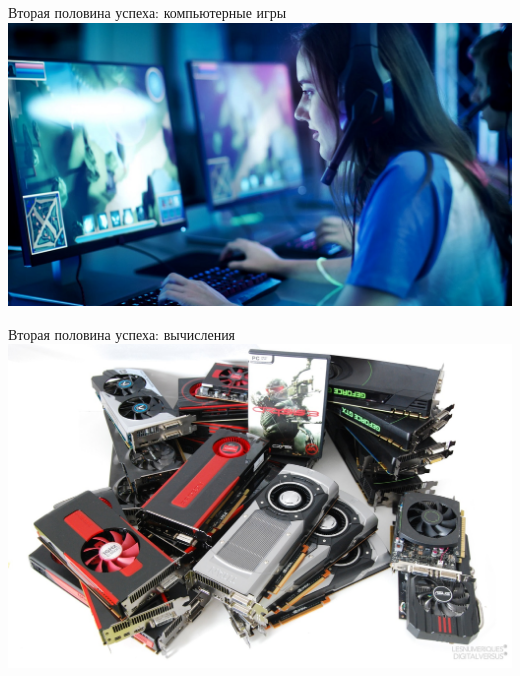 \documentclass[aspectratio=169]{beamer}
\begin{document}
\begin{frame}{Вторая половина успеха: компьютерные игры}
    \centering
    \includegraphics[width=.83\linewidth]{graphs/fig23.jpg}
\end{frame}

\begin{frame}{Вторая половина успеха: вычисления}
    \centering
    \includegraphics[width=.74\linewidth]{graphs/fig24.jpg}
\end{frame}
\end{document}
